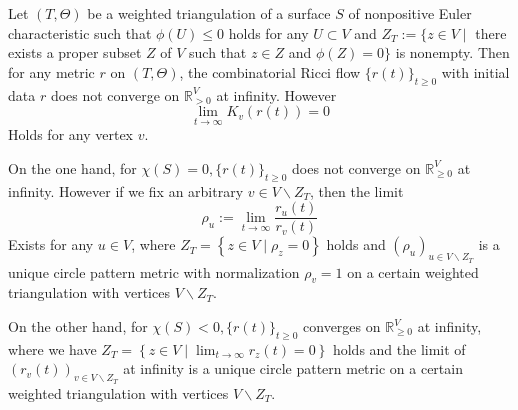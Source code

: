 \begin{theorem}
  \label{main-theorem} 
  Let $(T, \Theta)$ be a weighted triangulation of a surface $S$ of nonpositive Euler characteristic such that $\phi (U) \leq 0$ holds for any $U \subset V$ and $Z_{T}:=\{z \in V \mid$ there exists a proper subset $Z$ of $V$ such that $z \in Z$ and $\phi (Z)=0\}$ is nonempty. Then for any metric $r$ on $(T, \Theta)$, the combinatorial Ricci flow $\{r (t)\}_{t \geq 0}$ with initial data $r$ does not converge on $\mathbb{R}_{>0}^{V}$ at infinity. However
  $$
  \lim _{t \rightarrow \infty} K_{v}(r(t))=0
  $$
  Holds for any vertex $v$.

  On the one hand, for $\chi (S)=0,\{r (t)\}_{t \geq 0}$ does not converge on $\mathbb{R}_{\geq 0}^{V}$ at infinity. However if we fix an arbitrary $v \in V \backslash Z_{T}$, then the limit
  $$
  \rho_{u}:=\lim _{t \rightarrow \infty} \frac{r_{u}(t)}{r_{v}(t)}
  $$
  Exists for any $u \in V$, where $Z_{T}=\left\{z \in V \mid \rho_{z}=0\right\}$ holds and $\left (\rho_{u}\right)_{u \in V \backslash Z_{T}}$ is a unique circle pattern metric with normalization $\rho_{v}=1$ on a certain weighted triangulation with vertices $V \backslash Z_{T}$.

  On the other hand, for $\chi (S)<0,\{r (t)\}_{t \geq 0}$ converges on $\mathbb{R}_{\geq 0}^{V}$ at infinity, where we have $Z_{T}=\left\{z \in V \mid \lim _{t \rightarrow \infty} r_{z}(t)=0\right\}$ holds and the limit of $\left (r_{v}(t)\right)_{v \in V \backslash Z_{T}}$ at infinity is a unique circle pattern metric on a certain weighted triangulation with vertices $V \backslash Z_{T}$.
\end{theorem}
